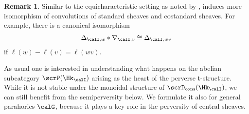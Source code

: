\documentclass[10pt, reqno]{amsart}
\theoremstyle{plain}
\theoremstyle{definition}
\newtheorem{remark}[theorem]{Remark}
\numberwithin{equation}{section}
\begin{document}
	\begin{remark}\label{isoms-are-canonical}
		Similar to the equicharacteristic setting as noted by \cite[Remark 4.1.5]{AR},  induces more isomorphism of convolutions of standard sheaves and costandard sheaves. For example, there is a canonical isomorphism
		$$
		\Delta_{\calI,w}\ast \nabla_{\calI,v}\cong \Delta_{\calI,wv}
		$$
		if $\ell(w)-\ell(v)=\ell(wv)$.
	\end{remark}
	
	As usual one is interested in understanding what happens on the abelian subcategory $\scrP(\Hk_\calI)$ arising as the heart of the perverse t-structure. While it is not stable under the monoidal structure of $\scrD_{\mathrm{cons}}(\Hk_\calI)$, we can still benefit from the semiperversity below. We formulate it also for general parahorics $\calG$, because it plays a key role in the perversity of central sheaves.
	
\end{document}
